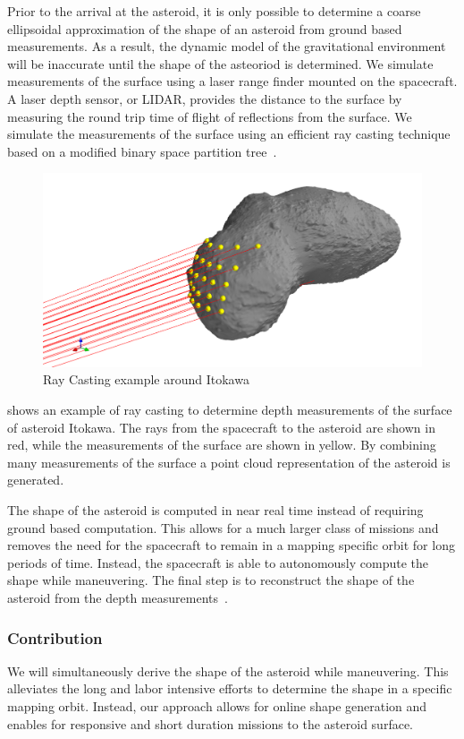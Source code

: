 \documentclass[11pt,reqno,twocolumn]{article} %
\begin{document}
Prior to the arrival at the asteroid, it is only possible to determine a coarse ellipsoidal approximation of the shape of an asteroid from ground based measurements. 
As a result, the dynamic model of the gravitational environment will be inaccurate until the shape of the asteoriod is determined. 
We simulate measurements of the surface using a laser range finder mounted on the spacecraft.
A laser depth sensor, or LIDAR, provides the distance to the surface by measuring the round trip time of flight of reflections from the surface.
We simulate the measurements of the surface using an efficient ray casting technique based on a modified binary space partition tree~\cite{formella1995}.
\begin{figure}[htbp]
    \centering
    \includegraphics[width=\columnwidth]{figures/raycasting.png}
    \caption{Ray Casting example around Itokawa\label{fig:raycasting}}
\end{figure}
 shows an example of ray casting to determine depth measurements of the surface of asteroid Itokawa.
The rays from the spacecraft to the asteroid are shown in red, while the measurements of the surface are shown in yellow.
By combining many measurements of the surface a  point cloud representation of the asteroid is generated.

The shape of the asteroid is computed in near real time instead of requiring ground based computation.
This allows for a much larger class of missions and removes the need for the spacecraft to remain in a mapping specific orbit for long periods of time.
Instead, the spacecraft is able to autonomously compute the shape while maneuvering.
The final step is to reconstruct the shape of the asteroid from the depth measurements~\cite{hoppe1992}.
\subsubsection*{Contribution}
We will simultaneously derive the shape of the asteroid while maneuvering.
This alleviates the long and labor intensive efforts to determine the shape in a specific mapping orbit.
Instead, our approach allows for online shape generation and enables for responsive and short duration missions to the asteroid surface.


\end{document}
